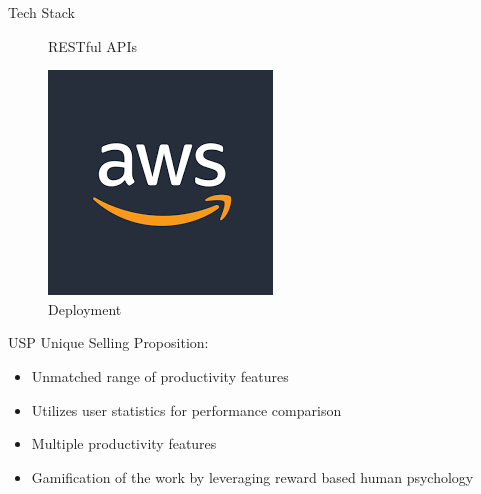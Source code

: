 \documentclass{beamer}
\begin{document}
\begin{frame}{Tech Stack}
\begin{figure}
\begin{minipage}[t]{0.2\textwidth}
            \caption{RESTful APIs}
        \end{minipage}\hfill
        \begin{minipage}[t]{0.2\textwidth}
            \centering
            \includegraphics[width=\textwidth]{AWS.png}
            \caption{Deployment}
        \end{minipage}
    \end{figure}
	\end{frame}

	\begin{frame}{USP}
		\justifying
		Unique Selling Proposition:
		\begin{itemize}
		\item Unmatched range of productivity features
		\item Utilizes user statistics for performance comparison
		\item Multiple productivity features		
		\item Gamification of the work by leveraging reward based human psychology
		
		\end{itemize}
	\end{frame}
\end{document}
